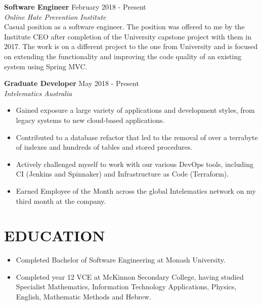 \documentclass[margin, 10pt]{res} %
\begin{document}
\begin{resume}
\textbf{Software Engineer} \hfill February 2018 - Present \\
{\sl Online Hate Prevention Institute} \\
Casual position as a software engineer. The position was offered to me by the Institute CEO after completion of the University capstone project with them in 2017. The work is on a different project to the one from University and is focused on extending the functionality and improving the code quality of an existing system using Spring MVC.

\textbf{Graduate Developer} \hfill May 2018 - Present \\
{\sl Intelematics Australia} \\
\begin{itemize}
\item Gained exposure a large variety of applications and development styles, from legacy systems to new cloud-based applications.
\item Contributed to a database refactor that led to the removal of over a terrabyte of indexes and hundreds of tables and stored procedures.
\item Actively challenged myself to work with our various DevOps tools, including CI (Jenkins and Spinnaker) and Infrastructure as Code (Terraform). %
\item Earned Employee of the Month across the global Intelematics network on my third month at the company.
\end{itemize} 


\section{EDUCATION}

\begin{itemize}
\item Completed Bachelor of Software Engineering at Monash University. %
\item Completed year 12 VCE at McKinnon Secondary College, having studied Specialist  Mathematics, Information Technology Applications, Physics, English, Mathematic Methods and Hebrew.
\end{itemize}



\end{resume}
\end{document}
